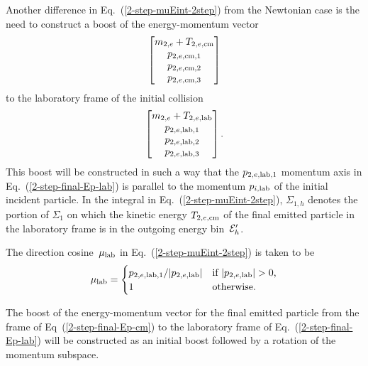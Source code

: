 {Another difference in Eq.~(\ref{2-step-muEint-2step}) from the 
Newtonian case is the need to construct a boost of the
energy-momentum vector
\begin{equation}
  \begin{bmatrix}
    m_{2,e} + T_{2,e,\textrm{cm}} \\
    p_{2,e,\textrm{cm},1} \\
    p_{2,e,\textrm{cm},2} \\
    p_{2,e,\textrm{cm},3}
  \end{bmatrix}
  \label{2-step-final-Ep-cm}
\end{equation}
to the laboratory frame of the initial collision
\begin{equation}
  \begin{bmatrix}
    m_{2,e} + T_{2,e,\textrm{lab}} \\
    p_{2,e,\textrm{lab},1} \\
    p_{2,e,\textrm{lab},2} \\
    p_{2,e,\textrm{lab},3}
  \end{bmatrix}.
  \label{2-step-final-Ep-lab}
\end{equation}
This boost will be constructed in such a way that the $p_{2,e,\textrm{lab},1}$
momentum axis in Eq.~(\ref{2-step-final-Ep-lab}) is parallel to
the momentum $p_{i,\textrm{lab}}$ of the initial incident particle.
In the integral in Eq.~(\ref{2-step-muEint-2step}), $\Sigma_{1,h}$
denotes the portion of $\Sigma_1$ on which the kinetic energy
$T_{2,e,\textrm{cm}}$ of the final emitted particle in the laboratory frame
is in the outgoing energy bin~${\cal E}_h'$.  

The direction cosine~$\mu_{\text{lab}}$
in Eq.~(\ref{2-step-muEint-2step}) is taken to be
\begin{equation}
  \mu_{\text{lab}} =
  \begin{cases}
    p_{2,e,\textrm{lab},1} / | p_{2,e,\textrm{lab}} | &
       \text {if $ | p_{2,e,\textrm{lab}} | > 0$,} \\
     1 & \text{otherwise.}
  \end{cases}
  \label{2-step-final-mu-lab}
\end{equation}

The boost of the energy-momentum vector for the final
emitted particle from the frame of Eq~(\ref{2-step-final-Ep-cm})
to the laboratory frame of Eq.~(\ref{2-step-final-Ep-lab})
will be constructed as an initial boost followed by a rotation
of the momentum subspace.

}
